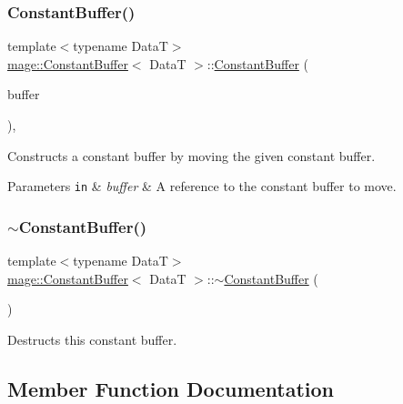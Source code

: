 \subsubsection{\texorpdfstring{Constant\+Buffer()}{ConstantBuffer()}\hspace{0.1cm}{\footnotesize\ttfamily [4/4]}}
{\footnotesize\ttfamily template$<$typename DataT$>$ \\
\hyperlink{structmage_1_1_constant_buffer}{mage\+::\+Constant\+Buffer}$<$ DataT $>$\+::\hyperlink{structmage_1_1_constant_buffer}{Constant\+Buffer} (\begin{DoxyParamCaption}\item[{\hyperlink{structmage_1_1_constant_buffer}{Constant\+Buffer}$<$ DataT $>$ \&\&}]{buffer }\end{DoxyParamCaption})\hspace{0.3cm}{\ttfamily [default]}, {\ttfamily [noexcept]}}

Constructs a constant buffer by moving the given constant buffer.


\begin{DoxyParams}[1]{Parameters}
\mbox{\tt in}  & {\em buffer} & A reference to the constant buffer to move. \\
\hline
\end{DoxyParams}
\hypertarget{structmage_1_1_constant_buffer_a874e9507ea3b6d2f630f061c2fc6d2d0}{}\label{structmage_1_1_constant_buffer_a874e9507ea3b6d2f630f061c2fc6d2d0} 
\subsubsection{\texorpdfstring{$\sim$\+Constant\+Buffer()}{~ConstantBuffer()}}
{\footnotesize\ttfamily template$<$typename DataT$>$ \\
\hyperlink{structmage_1_1_constant_buffer}{mage\+::\+Constant\+Buffer}$<$ DataT $>$\+::$\sim$\hyperlink{structmage_1_1_constant_buffer}{Constant\+Buffer} (\begin{DoxyParamCaption}{ }\end{DoxyParamCaption})\hspace{0.3cm}{\ttfamily [default]}}

Destructs this constant buffer. 

\subsection{Member Function Documentation}
\hypertarget{structmage_1_1_constant_buffer_a7592eed823334cdc3da614121f2b25ca}{}\label{structmage_1_1_constant_buffer_a7592eed823334cdc3da614121f2b25ca} 
